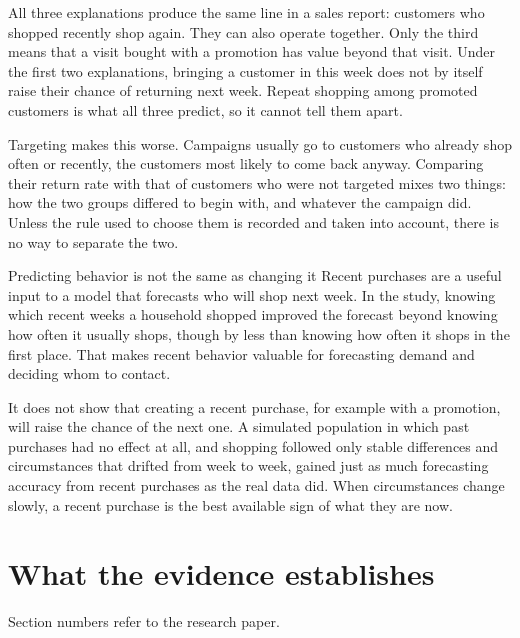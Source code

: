 \documentclass[11pt]{article}
\begin{document}
All three explanations produce the same line in a sales report: customers who shopped
recently shop again. They can also operate together. Only the third means that a visit bought
with a promotion has value beyond that visit. Under the first two explanations, bringing a customer in this
week does not by itself raise their chance of returning next week. Repeat shopping among
promoted customers is what all three predict, so it cannot tell them apart.

Targeting makes this worse. Campaigns usually go to customers who already shop often or
recently, the customers most likely to come back anyway. Comparing their return rate with
that of customers who were not targeted mixes two things: how the two groups differed to begin
with, and whatever the campaign did. Unless the rule used to choose them is recorded and taken into
account, there is no way to separate the two.

\vspace{2pt}
\begin{sidebar}{Predicting behavior is not the same as changing it}
Recent purchases are a useful input to a model that forecasts who will shop next week. In the
study, knowing which recent weeks a household shopped improved the forecast beyond knowing how
often it usually shops, though by less than knowing how often it shops in the first place. That
makes recent behavior valuable for forecasting demand and deciding whom to contact.

It does not show that creating a recent purchase, for example with a promotion, will raise the
chance of the next one. A simulated population in which past purchases had no effect at all,
and shopping followed only stable differences and circumstances that drifted from week to week,
gained just as much forecasting accuracy from recent purchases as the real data did. When
circumstances change slowly, a recent purchase is the best available sign of what they are now.
\end{sidebar}

\newpage
\section{What the evidence establishes}

Section numbers refer to the research paper.
\end{document}
